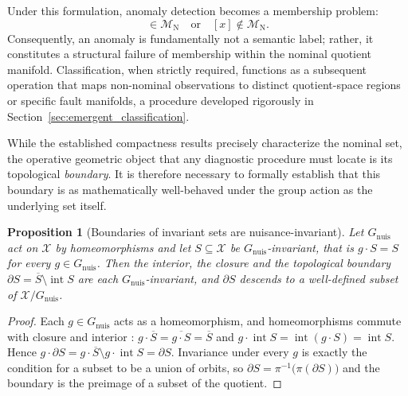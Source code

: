 \documentclass[a4paper]{cas-sc}
\newtheorem{proposition}{Proposition}
\newcommand{\X}{\ensuremath{\mathcal{X}}}
\newcommand{\Mnominal}{\ensuremath{\mathcal{M}_{\mathrm{N}}}}
\newcommand{\Gnuis}{\ensuremath{G_{\mathrm{nuis}}}}
\newcommand{\quotient}{\ensuremath{\mathcal{X}/G_{\mathrm{nuis}}}}
\begin{document}
Under this formulation, anomaly detection becomes a membership problem:
\begin{equation}
[x] \in \Mnominal
\quad \text{or} \quad
[x] \notin \Mnominal .
\label{eq:membership}
\end{equation}
Consequently, an anomaly is fundamentally not a semantic label; rather, it constitutes a structural failure of membership within the nominal quotient manifold. Classification, when strictly required, functions as a subsequent operation that maps non-nominal observations to distinct quotient-space regions or specific fault manifolds, a procedure developed rigorously in Section~\ref{sec:emergent_classification}.

While the established compactness results precisely characterize the nominal set, the operative geometric object that any diagnostic procedure must locate is its topological \emph{boundary}. It is therefore necessary to formally establish that this boundary is as mathematically well-behaved under the group action as the underlying set itself.

\begin{proposition}[Boundaries of invariant sets are nuisance-invariant]
\label{prop:boundary_invariant}
Let \(\Gnuis\) act on \(\X\) by homeomorphisms and let \(S\subseteq\X\) be
\(\Gnuis\)-invariant, that is \(g\cdot S=S\) for every \(g\in\Gnuis\). Then the
interior, the closure and the topological boundary
\(\partial S=\overline{S}\setminus\operatorname{int}S\) are each
\(\Gnuis\)-invariant, and \(\partial S\) descends to a well-defined subset of
\(\quotient\).
\end{proposition}

\begin{proof}
Each \(g\in\Gnuis\) acts as a homeomorphism, and homeomorphisms commute with
closure and interior \citep[Ch.~2]{rudin1976}: \(g\cdot\overline{S}
=\overline{g\cdot S}=\overline{S}\) and
\(g\cdot\operatorname{int}S=\operatorname{int}(g\cdot S)=\operatorname{int}S\).
Hence \(g\cdot\partial S = g\cdot\overline{S}\setminus
g\cdot\operatorname{int}S=\partial S\). Invariance under every \(g\) is
exactly the condition for a subset to be a union of orbits, so
\(\partial S=\pi^{-1}\bigl(\pi(\partial S)\bigr)\) and the boundary is the
preimage of a subset of the quotient.
\end{proof}
\end{document}
